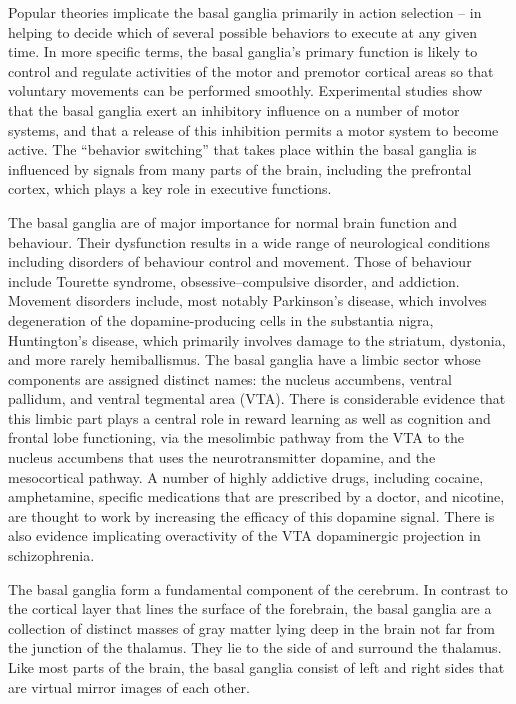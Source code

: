 Popular theories implicate the basal ganglia primarily in action selection -- in helping to decide which of several possible behaviors to execute at any given time. In more specific terms, the basal ganglia's primary function is likely to control and regulate activities of the motor and premotor cortical areas so that voluntary movements can be performed smoothly. Experimental studies show that the basal ganglia exert an inhibitory influence on a number of motor systems, and that a release of this inhibition permits a motor system to become active. The ``behavior switching'' that takes place within the basal ganglia is influenced by signals from many parts of the brain, including the prefrontal cortex, which plays a key role in executive functions.

The basal ganglia are of major importance for normal brain function and behaviour. Their dysfunction results in a wide range of neurological conditions including disorders of behaviour control and movement. Those of behaviour include Tourette syndrome, obsessive--compulsive disorder, and addiction. Movement disorders include, most notably Parkinson's disease, which involves degeneration of the dopamine-producing cells in the substantia nigra, Huntington's disease, which primarily involves damage to the striatum, dystonia, and more rarely hemiballismus. The basal ganglia have a limbic sector whose components are assigned distinct names: the nucleus accumbens, ventral pallidum, and ventral tegmental area (VTA). There is considerable evidence that this limbic part plays a central role in reward learning as well as cognition and frontal lobe functioning, via the mesolimbic pathway from the VTA to the nucleus accumbens that uses the neurotransmitter dopamine, and the mesocortical pathway. A number of highly addictive drugs, including cocaine, amphetamine, specific medications that are prescribed by a doctor, and nicotine, are thought to work by increasing the efficacy of this dopamine signal. There is also evidence implicating overactivity of the VTA dopaminergic projection in schizophrenia.

The basal ganglia form a fundamental component of the cerebrum. In contrast to the cortical layer that lines the surface of the forebrain, the basal ganglia are a collection of distinct masses of gray matter lying deep in the brain not far from the junction of the thalamus. They lie to the side of and surround the thalamus. Like most parts of the brain, the basal ganglia consist of left and right sides that are virtual mirror images of each other.

